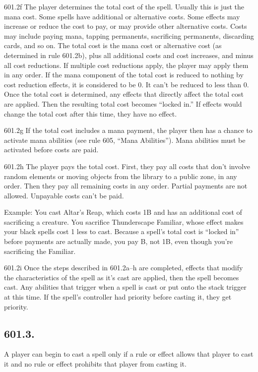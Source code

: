 601.2f The player determines the total cost of the spell. Usually this is just the mana cost. Some spells have additional or alternative costs. Some effects may increase or reduce the cost to pay, or may provide other alternative costs. Costs may include paying mana, tapping permanents, sacrificing permanents, discarding cards, and so on. The total cost is the mana cost or alternative cost (as determined in rule 601.2b), plus all additional costs and cost increases, and minus all cost reductions. If multiple cost reductions apply, the player may apply them in any order. If the mana component of the total cost is reduced to nothing by cost reduction effects, it is considered to be {0}. It can’t be reduced to less than {0}. Once the total cost is determined, any effects that directly affect the total cost are applied. Then the resulting total cost becomes “locked in.” If effects would change the total cost after this time, they have no effect.

601.2g If the total cost includes a mana payment, the player then has a chance to activate mana abilities (see rule 605, “Mana Abilities”). Mana abilities must be activated before costs are paid.

601.2h The player pays the total cost. First, they pay all costs that don’t involve random elements or moving objects from the library to a public zone, in any order. Then they pay all remaining costs in any order. Partial payments are not allowed. Unpayable costs can’t be paid.

Example: You cast Altar’s Reap, which costs {1}{B} and has an additional cost of sacrificing a creature. You sacrifice Thunderscape Familiar, whose effect makes your black spells cost {1} less to cast. Because a spell’s total cost is “locked in” before payments are actually made, you pay {B}, not {1}{B}, even though you’re sacrificing the Familiar.

601.2i Once the steps described in 601.2a–h are completed, effects that modify the characteristics of the spell as it’s cast are applied, then the spell becomes cast. Any abilities that trigger when a spell is cast or put onto the stack trigger at this time. If the spell’s controller had priority before casting it, they get priority.

\subsection*{601.3.}
A player can begin to cast a spell only if a rule or effect allows that player to cast it and no rule or effect prohibits that player from casting it.

